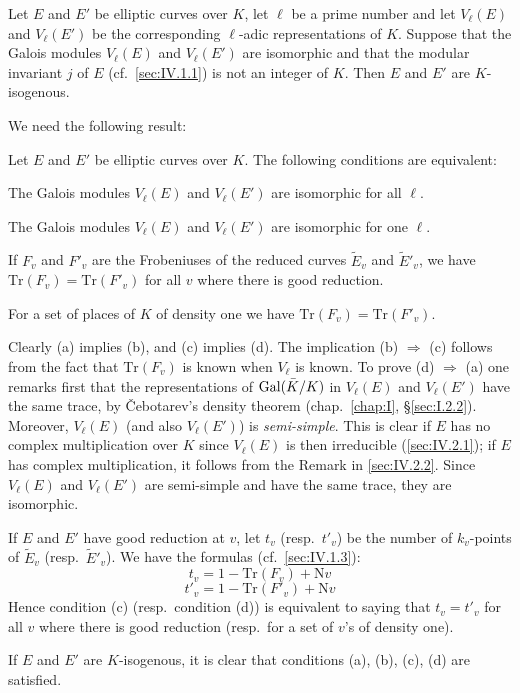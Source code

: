 
\begin{theorem}\label{thm:IV.2.3.1}
Let $E$ and $E'$ be elliptic curves over $K$, let $\ell$ be a prime
number and let $V_\ell(E)$ and $V_\ell(E')$ be the corresponding
$\ell$-adic representations of $K$.  Suppose that the Galois modules
$V_\ell(E)$ and $V_\ell(E')$ are isomorphic and that the modular
invariant $j$ of $E$ (cf.~\ref{sec:IV.1.1}) is not an integer of $K$.  Then $E$ and
$E'$ are $K$-isogenous.
\end{theorem}

We need the following result:

\begin{proposition}\label{prop:IV.2.3.1}
Let $E$ and $E'$ be elliptic curves over $K$.  The following conditions
are equivalent:
\begin{alist}
\item The Galois modules $V_\ell(E)$ and $V_\ell(E')$ are isomorphic for
all $\ell$.
\item The Galois modules $V_\ell(E)$ and $V_\ell(E')$ are isomorphic for
one $\ell$.
\item If $F_v$ and $F'_v$ are the Frobeniuses of the reduced curves
$\tilde{E}_v$ and $\tilde{E}'_v$, we have
$\mathrm{Tr}(F_v) = \mathrm{Tr}(F'_v)$ for all $v$ where there is good
reduction.
\item For a set of places of $K$ of density one we have
$\mathrm{Tr}(F_v) = \mathrm{Tr}(F'_v)$.
\end{alist}
\end{proposition}

Clearly (a) implies (b), and (c) implies (d).  The implication
(b) $\Rightarrow$ (c) follows from the fact that $\mathrm{Tr}(F_v)$ is
known when $V_\ell$ is known.  To prove (d) $\Rightarrow$ (a) one remarks
first that the representations of $\mathrm{Gal}(\bar{K}/K)$ in $V_\ell(E)$ and
$V_\ell(E')$ have the same trace, by \v{C}ebotarev's density theorem
(chap.~\ref{chap:I}, \S\ref{sec:I.2.2}).  Moreover, $V_\ell(E)$ (and also
$V_\ell(E')$) is \emph{semi-simple}.  This is clear if $E$ has no complex
multiplication over $K$ since $V_\ell(E)$ is then irreducible (\ref{sec:IV.2.1}); if
$E$ has complex multiplication, it follows from the Remark in \ref{sec:IV.2.2}.  Since
$V_\ell(E)$ and $V_\ell(E')$ are semi-simple and have the same trace,
they are isomorphic.


\begin{nlist}
\item If $E$ and $E'$ have good reduction at $v$, let $t_v$
(resp.~$t'_v$) be the number of $k_v$-points of $\tilde{E}_v$
(resp.~$\tilde{E}'_v$).  We have the formulas (cf.~\ref{sec:IV.1.3}):
\[
t_v = 1 - \mathrm{Tr}(F_v) + \mathrm{N}v
\]
\[
t'_v = 1 - \mathrm{Tr}(F'_v) + \mathrm{N}v
\]
Hence condition (c) (resp.~condition (d)) is equivalent to saying that
$t_v = t'_v$ for all $v$ where there is good reduction (resp.~for a set
of $v$'s of density one).

\item If $E$ and $E'$ are $K$-isogenous, it is clear that conditions
(a), (b), (c), (d) are satisfied.
\end{nlist}

